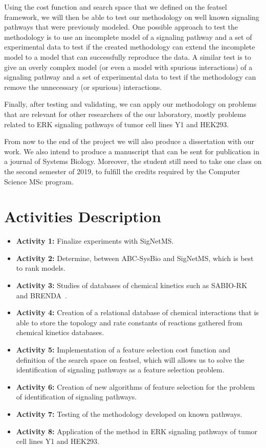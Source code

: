 Using the cost function and search space that we defined on the featsel
framework, we will then be able to test our methodology on well known
signaling pathways that were previously modeled. One possible approach 
to test the methodology is to use an incomplete model of a signaling 
pathway and a set of experimental data to test if the created 
methodology can extend the incomplete model to a model that can 
successfully reproduce the data. A similar test is to give an overly 
complex model (or even a model with spurious interactions) of a 
signaling pathway and a set of experimental data to test if the 
methodology can remove the unnecessary (or spurious) interactions. 

Finally, after testing and validating, we can apply our methodology on
problems that are relevant for other researchers of the our laboratory, 
mostly problems related to ERK signaling pathways of tumor cell lines
Y1 and HEK293.

From now to the end of the project we will also produce a dissertation
with our work. We also intend to produce a manuscript that can be sent 
for publication in a journal of Systems Biology. Moreover, the student
still need to take one class on the second semester of 2019, to fulfill
the credits required by the Computer Science MSc program. 


\section{Activities Description}
\label{sec:future_activities}
\begin{itemize}
    \item{\bf Activity 1:} Finalize experiments with SigNetMS.
    \item{\bf Activity 2:} Determine, between ABC-SysBio and SigNetMS,
        which is best to rank models.
    \item{\bf Activity 3:} Studies of databases of chemical kinetics 
        such as SABIO-RK~\cite{Wittig2011} and 
        BRENDA~\cite{Schomburg2004}.
    \item{\bf Activity 4:} Creation of a relational database of chemical 
        interactions that is able to store the topology and rate 
        constants of reactions gathered from chemical kinetics 
        databases.
    \item{\bf Activity 5:} Implementation of a feature selection cost
        function and definition of the search space on featsel, which 
        will allows us to solve the identification of signaling pathways 
        as a feature selection problem.
    \item{\bf Activity 6:} Creation of new algorithms of feature 
        selection for the problem of identification of signaling 
        pathways.
    \item{\bf Activity 7:} Testing of the methodology developed on known
        pathways.
    \item{\bf Activity 8:} Application of the method in ERK signaling 
        pathways of tumor cell lines Y1 and HEK293.
\end{itemize}

